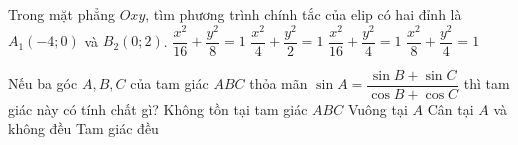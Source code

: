 \begin{ex}%
Trong mặt phẳng $O x y$, tìm phương trình chính tắc của elip có hai đỉnh là $A_1 (-4; 0)$ và $B_2 (0; 2)$. 
	\choice
	{$\dfrac{x^2}{16} + \dfrac{y^2}{8} =1$}
	{$\dfrac{x^2}{4} + \dfrac{y^2}{2} =1$}
	{\True $\dfrac{x^2}{16} + \dfrac{y^2}{4} =1$}
	{$\dfrac{x^2}{8} + \dfrac{y^2}{4} =1$}
\end{ex}

\begin{ex}%
Nếu ba góc $A, B, C$ của tam giác $ABC$ thỏa mãn $\sin A = \dfrac{\sin B + \sin C}{\cos B + \cos C}$ thì tam giác này có tính chất gì? 
	\choice
	{Không tồn tại tam giác $ABC$}
	{\True Vuông tại $A$}
	{Cân tại $A$ và không đều}
	{Tam giác đều}
\end{ex}

